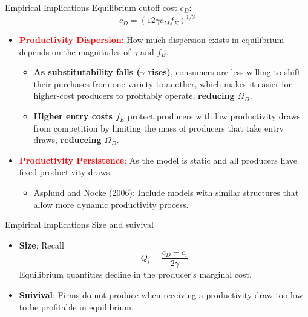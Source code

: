 \documentclass[aspectratio=169]{beamer}  %
\begin{document}
\begin{frame}{Empirical Implications}
    Equilibrium cutoff cost \(c_D\):
    \[
    c_D = (12 \gamma c_{M} f_{E})^{1/3}
    \]
    \begin{itemize}
        \item \textcolor{red}{\textbf{Productivity Dispersion}:} How much dispersion exists in equilibrium depends on the magnitudes of \(\gamma\) and \(f_E\).
        \begin{itemize}
            \item \textbf{As substitutability falls (\(\gamma\) rises)}, consumers are less willing to shift their purchases from one variety to another, which makes it easier for higher-cost producers to profitably operate, \textbf{reducing \(\Omega_D\)}.
            \item \textbf{Higher entry costs \(f_E\)} protect producers with low productivity draws from competition by limiting the mass of producers that take entry draws, \textbf{reduceing \(\Omega_D\)}.
        \end{itemize}
        \item \textcolor{red}{\textbf{Productivity Persistence}:} As the model is static and all producers have fixed productivity draws.
        \begin{itemize}
            \item Asplund and Nocke (2006): Include models with similar structures that allow more dynamic productivity process.
        \end{itemize} 
    \end{itemize}
\end{frame}

\begin{frame}{Empirical Implications}
    Size and suivival
    \begin{itemize}
        \item \textbf{Size}: Recall
        \[
          Q_i = \frac{c_D - c_i}{2\gamma}
        \]
        Equilibrium quantities decline in the producer's marginal cost.
        \item \textbf{Suivival}: Firms do not produce when receiving a productivity draw too low to be profitable in equilibrium.
    \end{itemize}
\end{frame}


\end{document}
